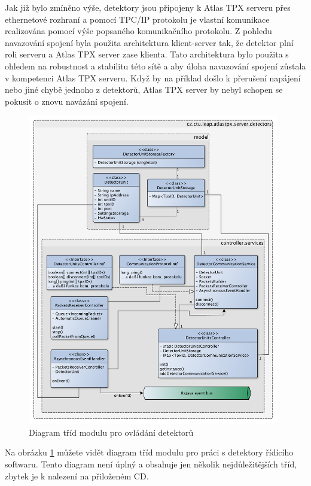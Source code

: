 Jak již bylo zmíněno výše, detektory jsou připojeny k Atlas TPX serveru přes ethernetové rozhraní a pomocí TPC/IP protokolu je vlastní komunikace realizována pomocí výše popsaného komunikačního protokolu. Z pohledu navazování spojení byla použita architektura klient-server tak, že detektor plní roli serveru a Atlas TPX server zase klienta. Tato architektura bylo použita s ohledem na robustnost a stabilitu této sítě a aby úloha navazování spojení zůstala v kompetenci Atlas TPX serveru. Když by na příklad došlo k přerušení napájení nebo jiné chybě jednoho z detektorů, Atlas TPX server by nebyl schopen se pokusit o znovu navázání spojení.

\begin{figure}[th]
	\begin{center}
		\includegraphics[width=11cm]{figures/atlas_tpx_detectors_class.pdf}
		\caption{Diagram tříd modulu pro ovládání detektorů}
		\label{fig:class:detectors}
	\end{center}
\end{figure}

Na obrázku \ref{fig:class:detectors} můžete vidět diagram tříd modulu pro práci s detektory řídícího softwaru. Tento diagram není úplný a obsahuje jen několik nejdůležitějších tříd, zbytek je k nalezení na přiloženém CD.

